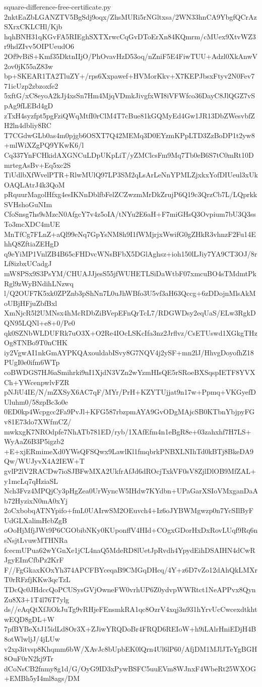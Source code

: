 \documentclass[11pt]{article}
\theoremstyle{definition}
\theoremstyle{remark}
\begin{document}
\begin{filecontents*}[overwrite]{square-difference-free-certificate.py}
2nktEaZbLGANZTV5BgSdj9oqx/ZhsMURi5rNGltxsa/2WN33hnCA9YbgfQCrAzSXrxCKLCHl/Kjb
hqhBNH31qKGvFA5RIEghSXTXrwcCqGvDToErXn84KQmrm/cMUex9XtvWZ3r9hdZIvv5OIPUeudO6
2Of9vBiS+Kmf35DktnIIjO/PhOvavHzD53oq/nZniF5E4FiwTUU+Adzl0XkAnwV2ov0jK55aZ83w
bp+SKEAR1TA2TluZY+/rps6Xxpawef+HVMorKkv+X7KEPJbsxFtyv2N0Fev771icUzp2zbzoxfe2
5xftG/xC8eyoA2kJj4xsSn7Hm4MjqVDmkJivgfxWI8iVFWfco36DayC8JlQGZ7vSpAg9fLEBd4gD
zTxH4syzfpt5pgFziQWqMtfI0rClM4T7cBue81kGQMyEd4Gw1JR13DbZWesvbfZH2ln4dbliy8RC
T7CGdwGLb0as4m0pjgb6OSXT7Q42MEMq3D0EYzmKPpLTD3ZzBoDP1t2yw8+mlWiXZgPQ9YKwK6/l
Cq337YnFCHkidAXGNCuLDpUKpLiT/yZMClcsFm9Mq7Tb0eB6S7tC0mRt10DmrtegAsBv+Eq5xc2S
TiUdlbXfWvelPTR+RlwMUlQ97LP3SM2qLsArLeNnYPMLZjxkxYofDIUeul3xUkOAQLAtrJ4k3QoM
pRquurMagolHfxg4esIKNnDblfbFelZCZwzmMrDkZrujP6Q19c3QrzCb7L/LQprkkSVHshoGuNIm
CfoSnsg7hs9sMzcN0AfgcY7v4z5oIA/tNYu2E6aH+F7miGHsQ3Ovpium7bU3Q3ssTo3mcXDC4mUE
MnTfCg7FLnZ+aQl99eNq7GpYsNM8h9I1fWMjrjxWwifG0gZHkR3vhnzF2Fu14EhhQ8ZftiaZEHgD
q9eYiMP1VnlZB4B65cFHDvcWNsBFbX5DGlAghsz+ioh150lLJiy7YA9CT3OJ/8rLf8izbxUCadgJ
mW8PSx9S3PsYM/CHUAJJjesS55jfWUHETLSiDaWtbF07xmcuBO4sTMdmtPkRgl9zWyBNdihLNzwq
l/Q2OUF7K5xk0ZPZnb3pShNn7L0uJhWBfo3U5vf3aH63Qccg+6zDDojnMlsAkMoUBjHFjuZbfBxl
XmNjcR5l2UMNsx4hMcRDbZiBVepEFnQrTcL7/RDGWDsy2eqUaS/ELw3RgkDQN95LQNl+e8+0/Pe0
qk0SZNbWLDUFRk7uO3X+O2Re4IOcLSKcIfa3nz2Jrflvz/CsETUswd1XGkgTHzOg8TNBo9T0nCHK
iy2VgwAI1nkGmAYPKQAxouldabISvy8G7NQV4j2ySF+mn2lJ/HhvgDoyofhZ18PUgI0e0ifm6WTp
coBWDGS7HJ6aSmihrki9nI1XjdN3VZn2wYzmHIsQE5rSRoeBXSqspIETF8YVXCh+YWcenpwlvFZR
pNJiU4IE/N/mZXSyX6AC7qF/MYr/PrH+KZYTUjjat9n17w+Ppmq+VKGyefDUluhm0/58zpBc3o0e
0ED0kp4Wcpgcc2Fa9PvJl+KFG587rbzpmAYA9GvODgMAjcSB0KTbnYbjpyFGv81E73do7XWfmCZ/
mwkxgK7NROdpfe7NhATb781ED/ryb/1XAfEfm4n1eBgR8e+03zahxhf7H7LS+WyAaZ6B3P5igzb2
+E+xjERmimeXd0YWsQFSQwx9LawlKl1fmqbrkPNBXLNIhTd0kBTj8BkeDA9Qw/WUJyvX4A2IEW+T
gvlP2lV2RACDw7ioSJBFwMXA2UkfrAfJd6dROcjTxkVF0sV8ZjlDlOB9MfZAL+y1mcLq7qHziaSL
Nch3Fvz4MPQjCy3pHgZea0UrWyncW5IHdw7KYdbn+UPaGarXSIoVMxganDaAb72HyzixN0mA0xYj
2oCxbobqATNYpifo+fmL0UAIrwSM2OEuvch4+Iz6oJYBWMgwzp0n7YcSIlByFUdGLXalimHcbZgB
oOoHjMfjJWt9P6CGObibNKy0KUponffV4HId+COgxGDorHxDxRovLUqf9Rq6nsNsjtLvuwMTHNRa
fcecmUPua62wYGnXe1jCL4naQ5MdeRD8lUetJpRvdh4YpydEihDSAIHN4dCwRJgyEImCfbPz2KrF
F//FgGkaxKOxYh374APCFBYceqaB9CMGqDHcq/4Y+z6D7vZo12dAhQkLMXrT0rRFzfjKKw3qcTzL
TDcQc0JHdccQoPCUSysGVjOwneFW0vrhUP6Z0ydvpWWRtct1NeAPPvx8QynZu8X3+1T4l76T7ylg
ds//eAqQtXfJiOkJuTg9vRHjeFEnsmkRA1qc8OzrV4xqj3n931hYrvUcCwcexdtkhtwEQD8gDL+W
7pfBYBeXtJ15idLd8Or3X+ZJiwYRQDoBr4FRQD6REIoW+h9iLAlrHniEDjH4B8otWlwljJ/4jLUw
v2xp3itvsp8Khqmm6bW/XAvJc8bUpbEK0lQrn4Ul6lP60/AfjDM1MJlJTeYgBGH8OuF0rN2kj9Tr
dCoNsCB2fnmy8g1d/G/OyG9ID3xPywBSFC5uuEVm8WJnxF4WbeRt25WXOG+EMBh5yI4ml8ags/DM

\end{filecontents*}
\end{document}

